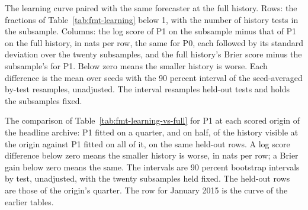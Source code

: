 \begin{table}[t]\centering\scriptsize
\caption{The learning curve paired with the same forecaster at the full history. Rows: the fractions of Table~\ref{tab:fmt-learning} below 1, with the number of history tests in the subsample. Columns: the log score of P1 on the subsample minus that of P1 on the full history, in nats per row, the same for P0, each followed by its standard deviation over the twenty subsamples, and the full history's Brier score minus the subsample's for P1. Below zero means the smaller history is worse. Each difference is the mean over seeds with the 90 percent interval of the seed-averaged by-test resamples, unadjusted. The interval resamples held-out tests and holds the subsamples fixed.}
\label{tab:fmt-learning-vs-full}
\resizebox{\columnwidth}{!}{}
\end{table}

\begin{table}[t]\centering\scriptsize
\caption{The comparison of Table~\ref{tab:fmt-learning-vs-full} for P1 at each scored origin of the headline archive: P1 fitted on a quarter, and on half, of the history visible at the origin against P1 fitted on all of it, on the same held-out rows. A log score difference below zero means the smaller history is worse, in nats per row; a Brier gain below zero means the same. The intervals are 90 percent bootstrap intervals by test, unadjusted, with the twenty subsamples held fixed. The held-out rows are those of the origin's quarter. The row for January 2015 is the curve of the earlier tables.}
\label{tab:fmt-learning-origins}

\end{table}

